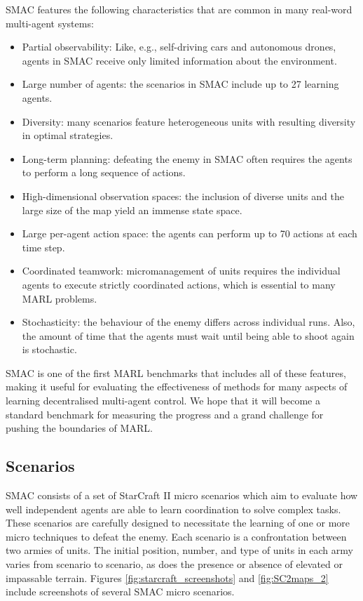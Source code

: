 \documentclass[twoside,11pt]{article}
\begin{document}
SMAC features the following characteristics that are common in many real-word multi-agent systems:
\begin{itemize}
	\setlength{\itemsep}{0pt}
	\setlength{\parskip}{2pt}
	\item Partial observability: Like, e.g., 
	self-driving cars and autonomous drones, agents in SMAC receive only 
	limited information about the environment.
	\item Large number of agents: the scenarios in SMAC include up to 27 learning agents.
	\item Diversity: many scenarios feature heterogeneous units with resulting 
	diversity in optimal strategies.
	\item Long-term planning: defeating the enemy in SMAC often requires the agents to perform a long sequence of actions.
	\item High-dimensional observation spaces: the inclusion of diverse units and the large size of the map yield an immense state space.
	\item Large per-agent action space: the agents can perform up to 70 actions 
	at each time step.
	\item Coordinated teamwork: micromanagement of units requires the individual agents to execute strictly coordinated actions, which is essential to many MARL problems.
	\item Stochasticity: the behaviour of the enemy differs across individual runs. Also, the amount of time that the agents must wait until being able to shoot again is stochastic.
\end{itemize}
SMAC is one of the first MARL benchmarks that includes all of these features, 
making it useful for evaluating the effectiveness of methods for many aspects 
of learning decentralised multi-agent control.
We hope that it will become a standard benchmark for measuring the progress and a grand challenge for pushing the boundaries of MARL.
\subsection{Scenarios}

SMAC consists of a set of StarCraft II micro scenarios which aim to evaluate how well independent agents are able to learn coordination to solve complex tasks. 
These scenarios are carefully designed to necessitate the learning of one or more micro techniques to defeat the enemy.
Each scenario is a confrontation between two armies of units.
The initial position, number, and type of units in each army varies from scenario to scenario, as does the presence or absence of elevated or impassable terrain. Figures \ref{fig:starcraft_screenshots}  and \ref{fig:SC2maps_2} include screenshots of several SMAC micro scenarios.
\end{document}
